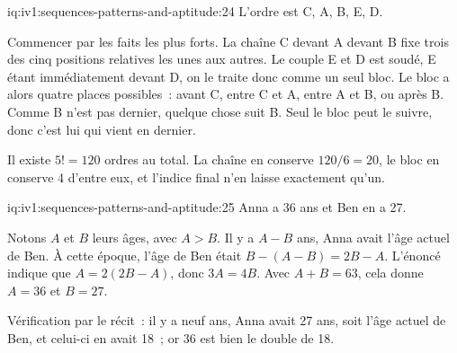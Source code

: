 \begin{solution}{iq:iv1:sequences-patterns-and-aptitude:24}
L'ordre est C, A, B, E, D.

Commencer par les faits les plus forts. La chaîne C devant A devant B fixe trois des cinq positions relatives les unes aux autres. Le couple E et D est soudé, E étant immédiatement devant D, on le traite donc comme un seul bloc. Le bloc a alors quatre places possibles~: avant C, entre C et A, entre A et B, ou après B. Comme B n'est pas dernier, quelque chose suit B. Seul le bloc peut le suivre, donc c'est lui qui vient en dernier.

Il existe $5! = 120$ ordres au total. La chaîne en conserve $120/6 = 20$, le bloc en conserve 4 d'entre eux, et l'indice final n'en laisse exactement qu'un.

\end{solution}

\begin{solution}{iq:iv1:sequences-patterns-and-aptitude:25}
Anna a 36 ans et Ben en a 27.

Notons $A$ et $B$ leurs âges, avec $A > B$. Il y a $A - B$ ans, Anna avait l'âge actuel de Ben. À cette époque, l'âge de Ben était $B - (A - B) = 2B - A$. L'énoncé indique que $A = 2(2B - A)$, donc $3A = 4B$. Avec $A + B = 63$, cela donne $A = 36$ et $B = 27$.

Vérification par le récit~: il y a neuf ans, Anna avait 27 ans, soit l'âge actuel de Ben, et celui-ci en avait 18~; or 36 est bien le double de 18.

\end{solution}


